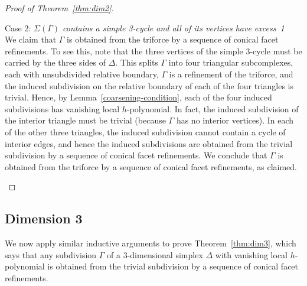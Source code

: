 \documentclass[ALCO,ThmDefs,Unicode,epreuves]{cedram}
\newenvironment{proofsection}[2]{\begin{enonce*}[remark]{#1 \emph{#2}} \ }{\end{enonce*}}
\begin{document}
\begin{proof}[Proof of Theorem~\ref{thm:dim2}]
\begin{proofsection}{Case 2:}{$\Sigma(\Gamma)$ contains a simple 3-cycle and all of its vertices have excess~1}
We claim that $\Gamma$ is obtained from the triforce by a sequence of conical facet refinements. To see this, note that the three vertices of the simple 3-cycle must be carried by the three sides of $\Delta$. This splits $\Gamma$ into four 
triangular subcomplexes, each with unsubdivided relative boundary, \ie $\Gamma$ is a refinement of the triforce, and the induced subdivision on the relative boundary of each of the four triangles is trivial. Hence, by Lemma~\ref{coarsening-condition}, each of the four induced subdivisions has vanishing local $h$-polynomial. In fact, the induced subdivision of the interior triangle must be trivial (because $\Gamma$ has no interior vertices). In each of the other three triangles, the induced subdivision cannot contain a cycle of interior edges, and hence the induced subdivisions are obtained from the trivial subdivision by a sequence of conical facet refinements. We conclude that $\Gamma$ is obtained from the triforce by a sequence of conical facet refinements, as claimed.\qedhere
\end{proofsection}
\end{proof}

\subsection{Dimension 3}

We now apply similar inductive arguments to prove Theorem~\ref{thm:dim3}, which says that any subdivision $\Gamma$ of a 3-dimensional simplex $\Delta$ with vanishing local $h$-polynomial is obtained from the trivial subdivision by a sequence of conical facet refinements.
\end{document}
